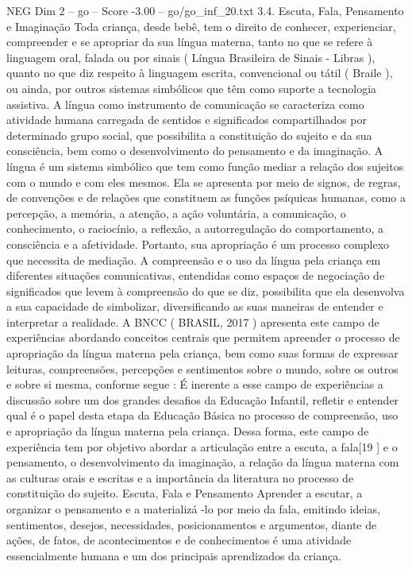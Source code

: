 \begin{textsample}{NEG Dim 2 – go – Score -3.00 – go/go\_inf\_20.txt}  \label{ex:f2_neg_115}
3.4.
Escuta, Fala, Pensamento e Imaginação Toda criança, desde bebê, tem o direito de conhecer, experienciar, compreender e se apropriar da sua língua materna, tanto no que se refere à linguagem oral, falada ou por sinais ( Língua Brasileira de Sinais - Libras ), quanto no que diz respeito à linguagem escrita, convencional ou tátil ( Braile ), ou ainda, por outros sistemas simbólicos que têm como suporte a tecnologia assistiva.
A língua como instrumento de comunicação se caracteriza como atividade humana carregada de sentidos e significados compartilhados por determinado grupo social, que possibilita a constituição do sujeito e da sua consciência, bem como o desenvolvimento do pensamento e da imaginação.
A língua é um sistema simbólico que tem como função mediar a relação dos sujeitos com o mundo e com eles mesmos.
Ela se apresenta por meio de signos, de regras, de convenções e de relações que constituem as funções psíquicas humanas, como a percepção, a memória, a atenção, a ação voluntária, a comunicação, o conhecimento, o raciocínio, a reflexão, a autorregulação do comportamento, a consciência e a afetividade.
Portanto, sua apropriação é um processo complexo que necessita de mediação.
A compreensão e o uso da língua pela criança em diferentes situações comunicativas, entendidas como espaços de negociação de significados que levem à compreensão do que se diz, possibilita que ela desenvolva a sua capacidade de simbolizar, diversificando as suas maneiras de entender e interpretar a realidade.
A BNCC ( BRASIL, 2017 ) apresenta este campo de experiências abordando conceitos centrais que permitem apreender o processo de apropriação da língua materna pela criança, bem como suas formas de expressar leituras, compreensões, percepções e sentimentos sobre o mundo, sobre os outros e sobre si mesma, conforme segue : É inerente a esse campo de experiências a discussão sobre um dos grandes desafios da Educação Infantil, refletir e entender qual é o papel desta etapa da Educação Básica no processo de compreensão, uso e apropriação da língua materna pela criança.
Dessa forma, este campo de experiência tem por objetivo abordar a articulação entre a escuta, a fala[19 ] e o pensamento, o desenvolvimento da imaginação, a relação da língua materna com as culturas orais e escritas e a importância da literatura no processo de constituição do sujeito.
Escuta, Fala e Pensamento Aprender a escutar, a organizar o pensamento e a materializá -lo por meio da fala, emitindo ideias, sentimentos, desejos, necessidades, posicionamentos e argumentos, diante de ações, de fatos, de acontecimentos e de conhecimentos é uma atividade essencialmente humana e um dos principais aprendizados da criança.

\end{textsample}
